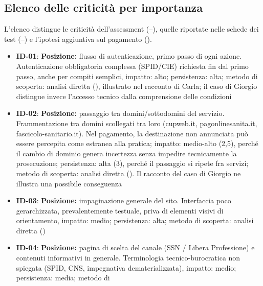 \label{doc:a:07}

\subsection[Criticità e priorità]{Elenco delle criticità per importanza}

L'elenco distingue le criticità dell'assessment (--), quelle
riportate nelle schede dei test (--) e l'ipotesi aggiuntiva sul
pagamento ().

\begin{itemize}
\item
  \hypertarget{req:ID-01}{}\textbf{ID-01}: \textbf{Posizione:} flusso di autenticazione, primo passo
  di ogni azione. Autenticazione obbligatoria complessa (SPID/CIE)
  richiesta fin dal primo passo, anche per compiti semplici, impatto:
  alto; persistenza: alta; metodo di scoperta: analisi diretta (),
  illustrato nel racconto di Carla; il caso di Giorgio distingue invece
  l'accesso tecnico dalla comprensione delle condizioni
\item
  \hypertarget{req:ID-02}{}\textbf{ID-02}: \textbf{Posizione:} passaggio tra domini/sottodomini del
  servizio. Frammentazione tra domini scollegati tra loro (cupweb.it,
  pagonlinesanita.it, fascicolo-sanitario.it). Nel pagamento, la destinazione
  non annunciata può essere percepita come estranea alla pratica; impatto:
  medio-alto (2,5), perché il cambio di dominio genera incertezza senza
  impedire tecnicamente la prosecuzione; persistenza: alta (3), perché
  il passaggio si ripete fra servizi; metodo di scoperta: analisi diretta ().
  Il racconto del caso di Giorgio ne illustra una possibile
  conseguenza
\item
  \hypertarget{req:ID-03}{}\textbf{ID-03}: \textbf{Posizione:} impaginazione generale del sito.
  Interfaccia poco gerarchizzata, prevalentemente testuale, priva di
  elementi visivi di orientamento, impatto: medio; persistenza: alta;
  metodo di scoperta: analisi diretta ()
\item
  \hypertarget{req:ID-04}{}\textbf{ID-04}: \textbf{Posizione:} pagina di scelta del canale (SSN /
  Libera Professione) e contenuti informativi in generale. Terminologia
  tecnico-burocratica non spiegata (SPID, CNS, impegnativa
  dematerializzata), impatto: medio; persistenza: media; metodo di

\end{itemize}
